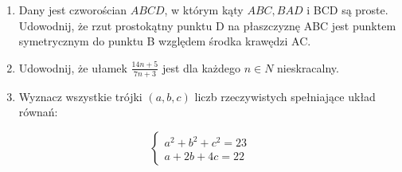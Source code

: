 \documentclass[10pt]{article}
\begin{document}
\begin{enumerate}
  \item Dany jest czworościan \(A B C D\), w którym kąty \(A B C, B A D\) i BCD są proste. Udowodnij, że rzut prostokątny punktu D na płaszczyznę ABC jest punktem symetrycznym do punktu B względem środka krawędzi AC.
  \item Udowodnij, że ułamek \(\frac{14 n+5}{7 n+3}\) jest dla każdego \(n \in N\) nieskracalny.
  \item Wyznacz wszystkie trójki \((a, b, c)\) liczb rzeczywistych spełniające układ równań:
\end{enumerate}

\[
\left\{\begin{array}{c}
a^{2}+b^{2}+c^{2}=23 \\
a+2 b+4 c=22
\end{array}\right.
\]
\end{document}
